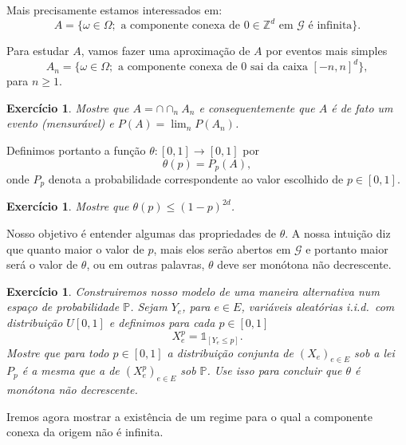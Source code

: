 \documentclass[reqno, final]{book}
\newcommand*\1{\mathds{1}}
\newtheorem{exercise}[example]{Exercício}
\def \iid{i.i.d.~}
\begin{document}
Mais precisamente estamos interessados em:
\begin{equation}
  A = \big\{\omega \in \Omega; \text{ a componente conexa de $0 \in \mathbb{Z}^d$ em $\mathcal{G}$ é infinita} \big\}.
\end{equation}

Para estudar $A$, vamos fazer uma aproximação de $A$ por eventos mais simples
\begin{equation}
  A_n = \big\{ \omega \in \Omega; \text{ a componente conexa de $0$ sai da caixa $[-n, n]^d$}\},
\end{equation}
para $n \geq 1$.

\begin{exercise}
  Mostre que $A = \cap \cap_n A_n$ e consequentemente que $A$ é de fato um evento (mensurável) e $P(A) = \lim_n P(A_n)$.
\end{exercise}

Definimos portanto a função $\theta:[0,1] \to [0,1]$ por
\begin{equation}
  \theta(p) = P_p(A),
\end{equation}
onde $P_p$ denota a probabilidade correspondente ao valor escolhido de $p \in [0,1]$.

\begin{exercise}
  Mostre que $\theta(p) \leq (1-p)^{2d}$.
\end{exercise}

Nosso objetivo é entender algumas das propriedades de $\theta$.
A nossa intuição diz que quanto maior o valor de $p$, mais elos serão abertos em $\mathcal{G}$ e portanto maior será o valor de $\theta$, ou em outras palavras, $\theta$ deve ser monótona não decrescente.

\begin{exercise}
  Construiremos nosso modelo de uma maneira alternativa num espaço de probabilidade $\mathbb{P}$.
  Sejam $Y_e$, para $e \in E$, variáveis aleatórias \iid com distribuição $U[0,1]$ e definimos para cada $p \in [0,1]$
  \begin{equation}
    X^p_e = \1_{[Y_e \leq p]}.
  \end{equation}
  Mostre que para todo $p \in [0,1]$ a distribuição conjunta de $(X_e)_{e \in E}$ sob a lei $P_p$ é a mesma que a de $(X^p_e)_{e \in E}$ sob $\mathbb{P}$.
  Use isso para concluir que $\theta$ é monótona não decrescente.
\end{exercise}

Iremos agora mostrar a existência de um regime para o qual a componente conexa da origem não é infinita.
\end{document}
